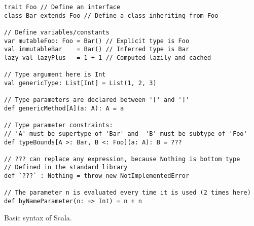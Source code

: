\begin{algorithm}

\begin{verbatim}
trait Foo // Define an interface
class Bar extends Foo // Define a class inheriting from Foo

// Define variables/constants
var mutableFoo: Foo = Bar() // Explicit type is Foo
val immutableBar    = Bar() // Inferred type is Bar
lazy val lazyPlus   = 1 + 1 // Computed lazily and cached

// Type argument here is Int
val genericType: List[Int] = List(1, 2, 3)

// Type parameters are declared between '[' and ']'
def genericMethod[A](a: A): A = a

// Type parameter constraints:
// 'A' must be supertype of 'Bar' and  'B' must be subtype of 'Foo'
def typeBounds[A >: Bar, B <: Foo](a: A): B = ???

// ??? can replace any expression, because Nothing is bottom type
// Defined in the standard library
def `???` : Nothing = throw new NotImplementedError

// The parameter n is evaluated every time it is used (2 times here)
def byNameParameter(n: => Int) = n + n
\end{verbatim}

\caption{Basic syntax of Scala. \label{scala:basics}}
\end{algorithm}